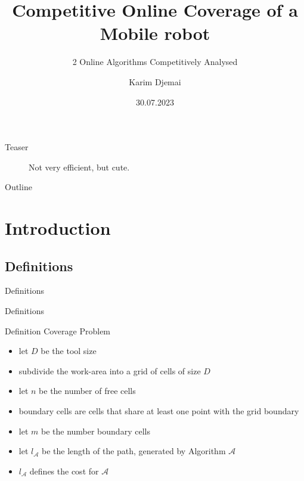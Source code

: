 \documentclass{beamer}
\title{Competitive Online Coverage of a Mobile robot}
\subtitle{2 Online Algorithms Competitively Analysed}
\author{Karim Djemai}
\institute{Universität Hamburg}
\date{30.07.2023}
\begin{document}

\begin{frame}
    \maketitle %
\end{frame}


\begin{frame}{Teaser}
    \begin{figure}
        \caption{Not very efficient, but cute.}
    \end{figure}
\end{frame}

\begin{frame}{Outline}
    \tableofcontents[hideallsubsections]
\end{frame}

\section{Introduction}
\subsection{Definitions}
\begin{frame}{Definitions}
\end{frame}

\begin{frame}{Definitions}
    \begin{block}{Definition Coverage Problem}
        \begin{itemize}
            \item let $D$ be the tool size
            \item subdivide the work-area into a grid of cells of size $D$
            \item let $n$ be the number of free cells
            \item boundary cells are cells that share at least one point with the grid boundary
            \item let $m$ be the number boundary cells
            \item let $l_\mathcal{A}$ be the length of the path, generated by Algorithm $\mathcal{A}$
            \item $l_\mathcal{A}$ defines the cost for $\mathcal{A}$
        \end{itemize}
    \end{block}
\end{frame}
\end{document}
